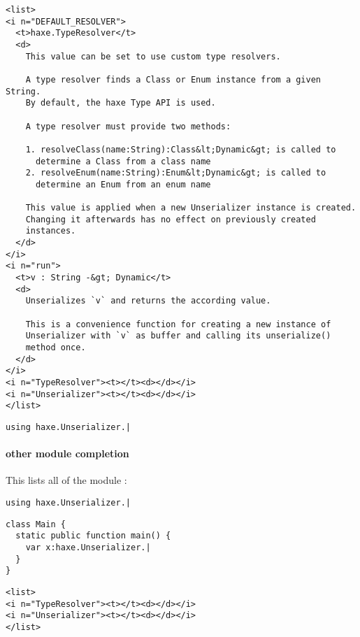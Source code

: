 \begin{lstlisting}
<list>
<i n="DEFAULT_RESOLVER">
  <t>haxe.TypeResolver</t>
  <d>
    This value can be set to use custom type resolvers.

    A type resolver finds a Class or Enum instance from a given String.
    By default, the haxe Type API is used.

    A type resolver must provide two methods:

    1. resolveClass(name:String):Class&lt;Dynamic&gt; is called to
      determine a Class from a class name
    2. resolveEnum(name:String):Enum&lt;Dynamic&gt; is called to
      determine an Enum from an enum name

    This value is applied when a new Unserializer instance is created.
    Changing it afterwards has no effect on previously created
    instances.
  </d>
</i>
<i n="run">
  <t>v : String -&gt; Dynamic</t>
  <d>
    Unserializes `v` and returns the according value.

    This is a convenience function for creating a new instance of
    Unserializer with `v` as buffer and calling its unserialize()
    method once.
  </d>
</i>
<i n="TypeResolver"><t></t><d></d></i>
<i n="Unserializer"><t></t><d></d></i>
</list>
\end{lstlisting}


\begin{lstlisting}
using haxe.Unserializer.|
\end{lstlisting}


\paragraph{other module completion}

This lists all  of the module :

\begin{lstlisting}
using haxe.Unserializer.|
\end{lstlisting}

\begin{lstlisting}
class Main {
  static public function main() {
    var x:haxe.Unserializer.|
  }
}
\end{lstlisting}

\begin{lstlisting}
<list>
<i n="TypeResolver"><t></t><d></d></i>
<i n="Unserializer"><t></t><d></d></i>
</list>
\end{lstlisting}


